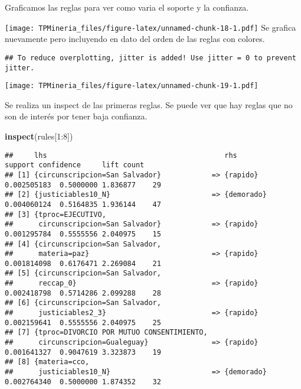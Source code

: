 \documentclass[runningheads,a4paper]{llncs}
\newenvironment{Shaded}{\footnotesize}{}
\newcommand{\KeywordTok}[1]{\textcolor[rgb]{0.00,0.44,0.13}{\textbf{{#1}}}}
\newcommand{\DecValTok}[1]{\textcolor[rgb]{0.25,0.63,0.44}{{#1}}}
\newcommand{\NormalTok}[1]{{#1}}
\newcommand{\OperatorTok}[1]{\textcolor[rgb]{0.40,0.40,0.40}{{#1}}}
\begin{document}
\normalsize

Graficamos las reglas para ver como varia el soporte y la confianza.

\texttt{[image: TPMineria\_files/figure-latex/unnamed-chunk-18-1.pdf]} Se
grafica nuevamente pero incluyendo en dato del orden de las reglas con
colores.

\begin{verbatim}
## To reduce overplotting, jitter is added! Use jitter = 0 to prevent jitter.
\end{verbatim}

\texttt{[image: TPMineria\_files/figure-latex/unnamed-chunk-19-1.pdf]}

Se realiza un inspect de las primeras reglas. Se puede ver que hay
reglas que no son de interés por tener baja confianza.

\scriptsize

\begin{Shaded}
\begin{Highlighting}[]
\KeywordTok{inspect}\NormalTok{(rules[}\DecValTok{1}\OperatorTok{:}\DecValTok{8}\NormalTok{])}
\end{Highlighting}
\end{Shaded}

\begin{verbatim}
##     lhs                                          rhs            support confidence     lift count
## [1] {circunscripcion=San Salvador}            => {rapido}   0.002505183  0.5000000 1.836877    29
## [2] {justiciables10_N}                        => {demorado} 0.004060124  0.5164835 1.936144    47
## [3] {tproc=EJECUTIVO,                                                                            
##      circunscripcion=San Salvador}            => {rapido}   0.001295784  0.5555556 2.040975    15
## [4] {circunscripcion=San Salvador,                                                               
##      materia=paz}                             => {rapido}   0.001814098  0.6176471 2.269084    21
## [5] {circunscripcion=San Salvador,                                                               
##      reccap_0}                                => {rapido}   0.002418798  0.5714286 2.099288    28
## [6] {circunscripcion=San Salvador,                                                               
##      justiciables2_3}                         => {rapido}   0.002159641  0.5555556 2.040975    25
## [7] {tproc=DIVORCIO POR MUTUO CONSENTIMIENTO,                                                    
##      circunscripcion=Gualeguay}               => {rapido}   0.001641327  0.9047619 3.323873    19
## [8] {materia=cco,                                                                                
##      justiciables10_N}                        => {demorado} 0.002764340  0.5000000 1.874352    32
\end{verbatim}
\end{document}
